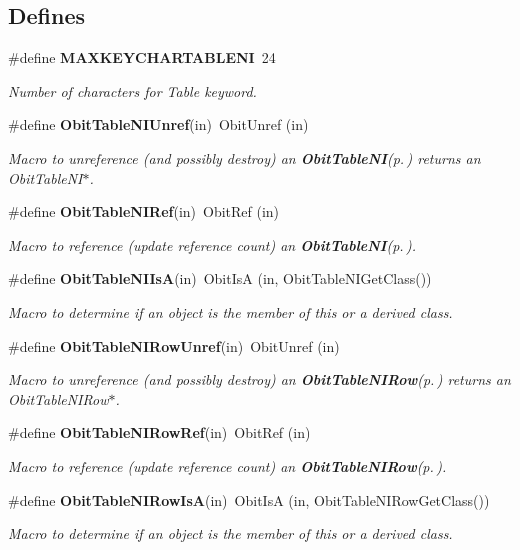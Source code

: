 \subsection*{Defines}
\begin{CompactItemize}
\item 
\#define {\bf MAXKEYCHARTABLENI}\ 24
\begin{CompactList}\small\item\em Number of characters for Table keyword. \item\end{CompactList}\item 
\#define {\bf Obit\-Table\-NIUnref}(in)\ Obit\-Unref (in)
\begin{CompactList}\small\item\em Macro to unreference (and possibly destroy) an {\bf Obit\-Table\-NI}{\rm (p.\,\pageref{structObitTableNI})} returns an Obit\-Table\-NI$\ast$. \item\end{CompactList}\item 
\#define {\bf Obit\-Table\-NIRef}(in)\ Obit\-Ref (in)
\begin{CompactList}\small\item\em Macro to reference (update reference count) an {\bf Obit\-Table\-NI}{\rm (p.\,\pageref{structObitTableNI})}. \item\end{CompactList}\item 
\#define {\bf Obit\-Table\-NIIs\-A}(in)\ Obit\-Is\-A (in, Obit\-Table\-NIGet\-Class())
\begin{CompactList}\small\item\em Macro to determine if an object is the member of this or a derived class. \item\end{CompactList}\item 
\#define {\bf Obit\-Table\-NIRow\-Unref}(in)\ Obit\-Unref (in)
\begin{CompactList}\small\item\em Macro to unreference (and possibly destroy) an {\bf Obit\-Table\-NIRow}{\rm (p.\,\pageref{structObitTableNIRow})} returns an Obit\-Table\-NIRow$\ast$. \item\end{CompactList}\item 
\#define {\bf Obit\-Table\-NIRow\-Ref}(in)\ Obit\-Ref (in)
\begin{CompactList}\small\item\em Macro to reference (update reference count) an {\bf Obit\-Table\-NIRow}{\rm (p.\,\pageref{structObitTableNIRow})}. \item\end{CompactList}\item 
\#define {\bf Obit\-Table\-NIRow\-Is\-A}(in)\ Obit\-Is\-A (in, Obit\-Table\-NIRow\-Get\-Class())
\begin{CompactList}\small\item\em Macro to determine if an object is the member of this or a derived class. \item\end{CompactList}\end{CompactItemize}
